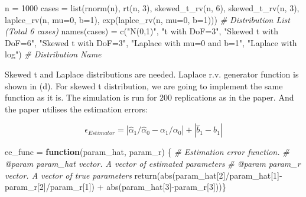 \documentclass[
  11pt,
]{article}
\newenvironment{Shaded}{\begin{snugshade}}{\end{snugshade}}
\newcommand{\AttributeTok}[1]{\textcolor[rgb]{0.77,0.63,0.00}{#1}}
\newcommand{\CommentTok}[1]{\textcolor[rgb]{0.56,0.35,0.01}{\textit{#1}}}
\newcommand{\ControlFlowTok}[1]{\textcolor[rgb]{0.13,0.29,0.53}{\textbf{#1}}}
\newcommand{\DecValTok}[1]{\textcolor[rgb]{0.00,0.00,0.81}{#1}}
\newcommand{\FunctionTok}[1]{\textcolor[rgb]{0.00,0.00,0.00}{#1}}
\newcommand{\NormalTok}[1]{#1}
\newcommand{\OtherTok}[1]{\textcolor[rgb]{0.56,0.35,0.01}{#1}}
\newcommand{\SpecialCharTok}[1]{\textcolor[rgb]{0.00,0.00,0.00}{#1}}
\newcommand{\StringTok}[1]{\textcolor[rgb]{0.31,0.60,0.02}{#1}}
\begin{document}
\begin{Shaded}
\begin{Highlighting}[]
\NormalTok{n }\OtherTok{=} \DecValTok{1000}
\NormalTok{cases }\OtherTok{=} \FunctionTok{list}\NormalTok{(}\FunctionTok{rnorm}\NormalTok{(n), }\FunctionTok{rt}\NormalTok{(n, }\DecValTok{3}\NormalTok{), }\FunctionTok{skewed\_t\_rv}\NormalTok{(n, }\DecValTok{6}\NormalTok{), }\FunctionTok{skewed\_t\_rv}\NormalTok{(n, }\DecValTok{3}\NormalTok{), }\FunctionTok{laplce\_rv}\NormalTok{(n, }\AttributeTok{mu=}\DecValTok{0}\NormalTok{, }\AttributeTok{b=}\DecValTok{1}\NormalTok{), }\FunctionTok{exp}\NormalTok{(}\FunctionTok{laplce\_rv}\NormalTok{(n, }\AttributeTok{mu=}\DecValTok{0}\NormalTok{, }\AttributeTok{b=}\DecValTok{1}\NormalTok{))) }\CommentTok{\# Distribution List (Total 6 cases)}
\FunctionTok{names}\NormalTok{(cases) }\OtherTok{=} \FunctionTok{c}\NormalTok{(}\StringTok{"N(0,1)"}\NormalTok{, }\StringTok{"t with DoF=3"}\NormalTok{, }\StringTok{"Skewed t with DoF=6"}\NormalTok{, }\StringTok{"Skewed t with DoF=3"}\NormalTok{, }\StringTok{"Laplace with mu=0 and b=1"}\NormalTok{, }\StringTok{"Laplace with log"}\NormalTok{) }\CommentTok{\# Distribution Name}
\end{Highlighting}
\end{Shaded}

Skewed t and Laplace distributions are needed. Laplace r.v. generator
function is shown in (d). For skewed t distribution, we are going to
implement the same function as it is. The simulation is run for 200
replications as in the paper. And the paper utilises the estimation
errors:

\[ \epsilon_{Estimator}=|\hat\alpha_1/\hat\alpha_0-\alpha_1/\alpha_0|+|\hat b_1-b_1|\]

\begin{Shaded}
\begin{Highlighting}[]
\NormalTok{ee\_func }\OtherTok{=} \ControlFlowTok{function}\NormalTok{(param\_hat, param\_r) \{}
  \CommentTok{\#\textquotesingle{} Estimation error function.}
  \CommentTok{\#\textquotesingle{} @param param\_hat vector. A vector of estimated parameters}
  \CommentTok{\#\textquotesingle{} @param param\_r vector. A vector of true parameters}
  \FunctionTok{return}\NormalTok{(}\FunctionTok{abs}\NormalTok{(param\_hat[}\DecValTok{2}\NormalTok{]}\SpecialCharTok{/}\NormalTok{param\_hat[}\DecValTok{1}\NormalTok{]}\SpecialCharTok{{-}}\NormalTok{param\_r[}\DecValTok{2}\NormalTok{]}\SpecialCharTok{/}\NormalTok{param\_r[}\DecValTok{1}\NormalTok{]) }\SpecialCharTok{+} \FunctionTok{abs}\NormalTok{(param\_hat[}\DecValTok{3}\NormalTok{]}\SpecialCharTok{{-}}\NormalTok{param\_r[}\DecValTok{3}\NormalTok{]))\}}
\end{Highlighting}
\end{Shaded}
\end{document}
